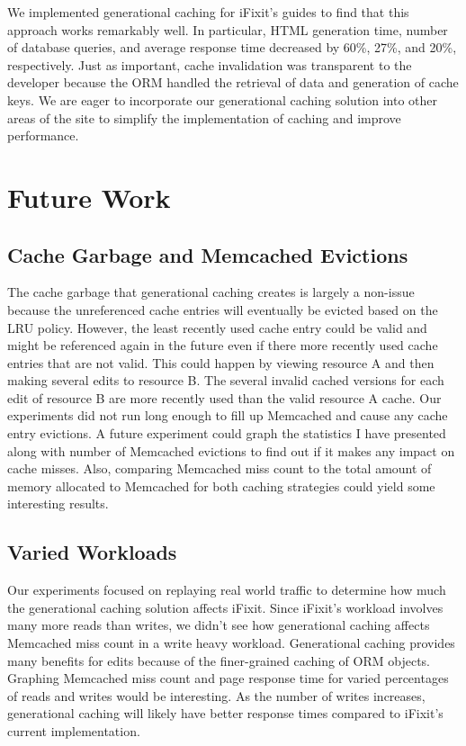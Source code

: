 \documentclass[12pt]{ucthesis}
\begin{document}
We implemented generational caching for \textsf{iFixit}'s guides to find that this approach works remarkably well.
In particular, HTML generation time, number of database queries, and average response time decreased by 60\%, 27\%, and 20\%, respectively.
Just as important, cache invalidation was transparent to the developer because the ORM handled the retrieval of data and generation of cache keys.
We are eager to incorporate our generational caching solution into other areas of the site to simplify the implementation of caching and improve performance.

\section{Future Work}
\subsection{Cache Garbage and Memcached Evictions}
The cache garbage that generational caching creates is largely a non-issue because the unreferenced cache entries will eventually be evicted based on the LRU policy.
However, the least recently used cache entry could be valid and might be referenced again in the future even if there more recently used cache entries that are not valid.
This could happen by viewing resource A and then making several edits to resource B.
The several invalid cached versions for each edit of resource B are more recently used than the valid resource A cache.
Our experiments did not run long enough to fill up \textsf{Memcached} and cause any cache entry evictions.
A future experiment could graph the statistics I have presented along with number of \textsf{Memcached} evictions to find out if it makes any impact on cache misses.
Also, comparing \textsf{Memcached} miss count to the total amount of memory allocated to \textsf{Memcached} for both caching strategies could yield some interesting results.

\subsection{Varied Workloads}
Our experiments focused on replaying real world traffic to determine how much the generational caching solution affects \textsf{iFixit}.
Since \textsf{iFixit}'s workload involves many more reads than writes, we didn't see how generational caching affects \textsf{Memcached} miss count in a write heavy workload.
Generational caching provides many benefits for edits because of the finer-grained caching of ORM objects.
Graphing \textsf{Memcached} miss count and page response time for varied percentages of reads and writes would be interesting.
As the number of writes increases, generational caching will likely have better response times compared to \textsf{iFixit}'s current implementation.



\clearpage


\end{document}

